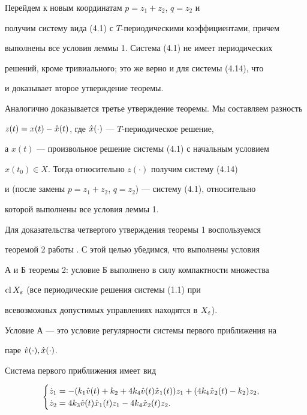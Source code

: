 Перейдем к новым координатам $ p=z_1 + z_2$, $q=z_2$ и


получим систему вида (4.1) с $T$-периодическими коэффициентами, причем


выполнены все условия леммы 1. Система (4.1) не имеет периодических


решений, кроме тривиального; это же верно и для системы (4.14), что


и доказывает второе утверждение теоремы.





Аналогично доказывается  третье утверждение теоремы. Мы составляем разность


$z(t)=x(t) - \Hat x(t)$, где $\Hat x(\cdot)$ --- $T$-периодическое решение,


а $x(t)$ --- произвольное решение системы (4.1) с начальным условием


$x(t_0)\in X$. Тогда относительно $z(\cdot)$ получим систему (4.14)


и (после замены $p=z_1 + z_2$, $q=z_2$) --- систему (4.1), относительно


которой выполнены все условия леммы 1.





Для доказательства четвертого утверждения теоремы 1 воспользуемся


теоремой 2 работы \cite{Ton}. С этой целью убедимся, что выполнены условия


А и Б теоремы 2: условие Б выполнено в силу компактности множества


$\operatorname{cl} X_{\varepsilon}$ (все периодические решения системы (1.1) при


всевозможных допустимых управлениях находятся в $X_{\varepsilon}$).


Условие А --- это условие регулярности системы первого приближения на


паре $\Hat v(\cdot), \Hat x(\cdot)$.


Система первого приближения имеет вид


%


\begin{equation}


\begin{cases}


\Dot z_1=-(k_1\Hat v(t)+k_2+4k_4\Hat v(t)\Hat x_1(t))z_1+(4k_4\Hat x_2(t) - k_2)z_2,\\


\Dot z_2= 4k_3\Hat v(t)\Hat x_1(t)z_1 - 4k_4\Hat x_2(t)z_2.


\end{cases}


\end{equation}


